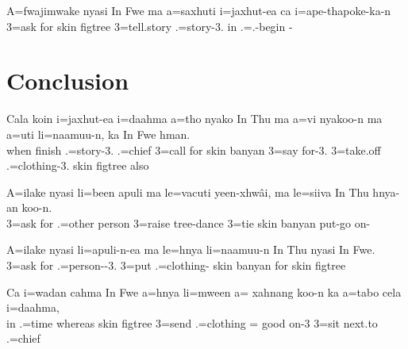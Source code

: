 \ea
\gll A=fwajimwake nyasi In Fwe ma a=saxhuti i=jaxhut-ea ca i=ape-thapoke-ka-n\\ 3=ask for skin figtree  3=tell.story .=story-3. in .=.-begin -\\ \glt {}
\z

\section{Conclusion}

\ea
\gll Cala koin i=jaxhut-ea i=daahma a=tho nyako In Thu ma a=vi nyakoo-n ma a=uti li=naamuu-n, ka In Fwe hman.\\ when finish .=story-3. .=chief 3=call for skin banyan  3=say for-3.  3=take.off .=clothing-3.  skin figtree also\\ \glt {}
\z

\ea
\gll A=ilake nyasi li=been apuli ma le=vacuti yeen-xhwâi, ma le=siiva In Thu hnya-an koo-n.\\ 3=ask for .=other person  3=raise tree-dance  3=tie skin banyan put-go on-\\ \glt {}
\z

\ea
\gll A=ilake nyasi li=apuli-n-ea ma le=hnya li=naamuu-n In Thu nyasi In Fwe.\\ 3=ask for .=person--3.  3=put .=clothing- skin banyan for skin figtree\\ \glt {}
\z

\ea
\gll Ca i=wadan cahma In Fwe a=hnya li=mween a= xahnang koo-n ka a=tabo cela i=daahma,\\ 
     in .=time whereas skin figtree 3=send .=clothing = good on-3  3=sit next.to .=chief\\ 
\glt {}
\z

